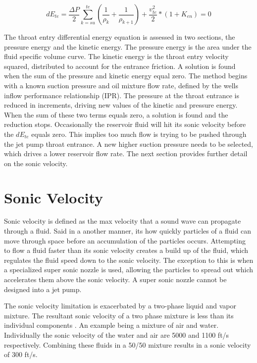 \documentclass{article}
\begin{document}
\begin{equation}
dE_{te} = \frac{\Delta P}{2}\sum_{k=su}^{te} (\frac{1}{\rho_{k}} + \frac{1}{\rho_{k+1}}) + \frac{v_{te}^{2}}{2} * (1+K_{en}) = 0
\label{trap_entr}
\end{equation}

The throat entry differential energy equation is assessed in two sections, the pressure energy and the kinetic energy. The pressure energy is the area under the fluid specific volume curve. The kinetic energy is the throat entry velocity squared, distributed to account for the entrance friction. A solution is found when the sum of the pressure and kinetic energy equal zero. The method begins with a known suction pressure and oil mixture flow rate, defined by the wells inflow performance relationship (IPR). The pressure at the throat entrance is reduced in increments, driving new values of the kinetic and pressure energy. When the sum of these two terms equals zero, a solution is found and the reduction stops. Occasionally the reservoir fluid will hit its sonic velocity before the $dE_{te}$ equals zero. This implies too much flow is trying to be pushed through the jet pump throat entrance. A new higher suction pressure needs to be selected, which drives a lower reservoir flow rate. The next section provides further detail on the sonic velocity.

\section{Sonic Velocity}

Sonic velocity is defined as the max velocity that a sound wave can propagate through a fluid. Said in a another manner, its how quickly particles of a fluid can move through space before an accumulation of the particles occurs. Attempting to flow a fluid faster than its sonic velocity creates a build up of the fluid, which regulates the fluid speed down to the sonic velocity. The exception to this is when a specialized super sonic nozzle is used, allowing the particles to spread out which accelerates them above the sonic velocity. A super sonic nozzle cannot be designed into a jet pump.

The sonic velocity limitation is exacerbated by a two-phase liquid and vapor mixture. The resultant sonic velocity of a two phase mixture is less than its individual components \cite{himr}. An example being a mixture of air and water. Individually the sonic velocity of the water and air are 5000 and 1100 ft/s respectively. Combining these fluids in a 50/50 mixture results in a sonic velocity of 300 ft/s.
\end{document}
